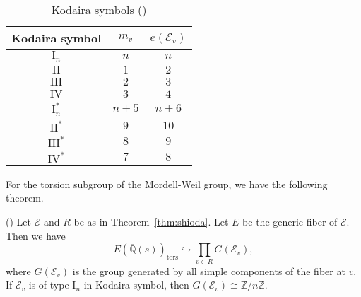\documentclass[main]{subfiles}
\begin{document}
\begin{table}[H]
    \centering
    \caption{Kodaira symbols (\cite[pp.136-137 付録2]{ref:shioda1993})}
    \begin{tabular}{|c|c|c|}
        \hline
        Kodaira symbol & $m_v$ & $e(\mathcal{E}_v)$ \\
        \hline
        $\mathrm{I}_n$   & $n$   & $n$                \\
        $\mathrm{II}$    & $1$   & $2$                \\
        $\mathrm{III}$   & $2$   & $3$                \\
        $\mathrm{IV}$    & $3$   & $4$                \\
        $\mathrm{I}_n^*$ & $n+5$ & $n+6$              \\
        $\mathrm{II}^*$  & $9$   & $10$               \\
        $\mathrm{III}^*$ & $8$   & $9$                \\
        $\mathrm{IV}^*$  & $7$   & $8$                \\
        \hline
    \end{tabular}
    \label{tab:kodaira}
\end{table}

For the torsion subgroup of the Mordell-Weil group, we have the following theorem.
\begin{thm}{(\cite[Lem.3.5]{ref:naskrecki2013})}
    \label{thm:torsion}
    Let $\mathcal{E}$ and $R$ be as in Theorem~\ref{thm:shioda}.
    Let $E$ be the generic fiber of $\mathcal{E}$.
    Then we have
    \begin{equation*}
        E(\overline{\mathbb{Q}}(s))_{\text{tors}} \hookrightarrow \prod_{v \in R} G(\mathcal{E}_{v}),
    \end{equation*}
    where $G(\mathcal{E}_{v})$ is the group generated by all simple components of the fiber at $v$.
    If $\mathcal{E}_{v}$ is of type $\mathrm{I}_n$ in Kodaira symbol, then $G(\mathcal{E}_{v}) \cong \mathbb{Z} / n \mathbb{Z}$.
\end{thm}
\end{document}

